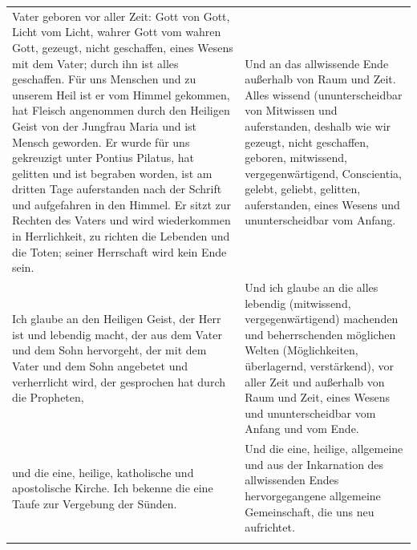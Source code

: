 \documentclass[
  ngerman,
]{article}
\begin{document}
\begin{longtable}[]{@{}
  >{\raggedright\arraybackslash}p{}
  >{\raggedright\arraybackslash}p{}@{}}
\begin{minipage}[b]{\linewidth}
Vater geboren vor aller Zeit: Gott von Gott, Licht vom Licht, wahrer
Gott vom wahren Gott, gezeugt, nicht geschaffen, eines Wesens mit dem
Vater; durch ihn ist alles geschaffen. Für uns Menschen und zu unserem
Heil ist er vom Himmel gekommen, hat Fleisch angenommen durch den
Heiligen Geist von der Jungfrau Maria und ist Mensch geworden. Er wurde
für uns gekreuzigt unter Pontius Pilatus, hat gelitten und ist begraben
worden, ist am dritten Tage auferstanden nach der Schrift und
aufgefahren in den Himmel. Er sitzt zur Rechten des Vaters und wird
wiederkommen in Herrlichkeit, zu richten die Lebenden und die Toten;
seiner Herrschaft wird kein Ende sein.
\end{minipage} & \begin{minipage}[b]{\linewidth}\raggedright
Und an das allwissende Ende außerhalb von Raum und Zeit. Alles wissend
(ununterscheidbar von Mitwissen und auferstanden, deshalb wie wir
gezeugt, nicht geschaffen, geboren, mitwissend, vergegenwärtigend,
Conscientia, gelebt, geliebt, gelitten, auferstanden, eines Wesens und
ununterscheidbar vom Anfang.
\end{minipage} \\
\begin{minipage}[b]{\linewidth}\raggedright
Ich glaube an den Heiligen Geist, der Herr ist und lebendig macht, der
aus dem Vater und dem Sohn hervorgeht, der mit dem Vater und dem Sohn
angebetet und verherrlicht wird, der gesprochen hat durch die Propheten,
\end{minipage} & \begin{minipage}[b]{\linewidth}\raggedright
Und ich glaube an die alles lebendig (mitwissend, vergegenwärtigend)
machenden und beherrschenden möglichen Welten (Möglichkeiten,
überlagernd, verstärkend), vor aller Zeit und außerhalb von Raum und
Zeit, eines Wesens und ununterscheidbar vom Anfang und vom Ende.
\end{minipage} \\
\begin{minipage}[b]{\linewidth}\raggedright
und die eine, heilige, katholische und apostolische Kirche. Ich bekenne
die eine Taufe zur Vergebung der Sünden.
\end{minipage} & \begin{minipage}[b]{\linewidth}\raggedright
Und die eine, heilige, allgemeine und aus der Inkarnation des
allwissenden Endes hervorgegangene allgemeine Gemeinschaft, die uns neu
aufrichtet.
\end{minipage} \\
\begin{minipage}[b]{\linewidth}\raggedright

\end{minipage}
\end{longtable}
\end{document}
